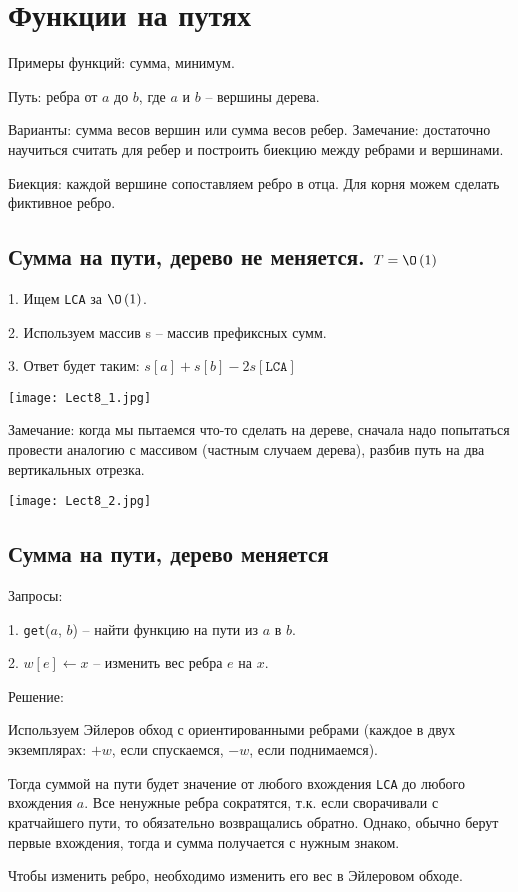 \chapter{Функции на путях}
	Примеры функций: сумма, минимум.

	Путь: ребра от $a$ до $b$, где $a$ и $b$ -- вершины дерева. 

	Варианты: сумма весов вершин или сумма весов ребер. Замечание: достаточно научиться считать для ребер и построить биекцию между ребрами и вершинами.

	Биекция: каждой вершине сопоставляем ребро в отца. Для корня можем сделать фиктивное ребро. 


  \section{Сумма на пути, дерево не меняется. $T = \O\left(1\right)$}
	1. Ищем \texttt{LCA} за $\O\left(1\right)$. 

	2. Используем массив s -- массив префиксных сумм. 

	3. Ответ будет таким: $s[a] + s[b] - 2s[\texttt{LCA}]$ 


\texttt{[image: Lect8\_1.jpg]}

	Замечание: когда мы пытаемся что-то сделать на дереве, сначала надо попытаться провести аналогию с массивом (частным случаем дерева), разбив путь на два вертикальных отрезка. 

  
\texttt{[image: Lect8\_2.jpg]}

  \section{Сумма на пути, дерево меняется}
	Запросы: 

	1. \texttt{get}($a$, $b$) -- найти функцию на пути из $a$ в $b$.

	2. $w[e] \leftarrow x$ -- изменить вес ребра $e$ на $x$. 

	Решение: 

	Используем Эйлеров обход с ориентированными ребрами (каждое в двух экземплярах: $+w$, если спускаемся, $-w$, если поднимаемся). 

	Тогда суммой на пути будет значение от любого вхождения \texttt{LCA} до любого вхождения $a$. Все ненужные ребра сократятся, т.к. если сворачивали с кратчайшего пути, то обязательно возвращались обратно. Однако, обычно берут первые вхождения, тогда и сумма получается с нужным знаком.

	Чтобы изменить ребро, необходимо изменить его вес в Эйлеровом обходе. 

